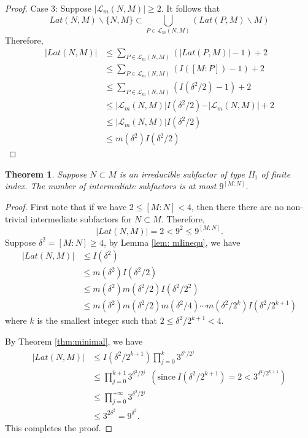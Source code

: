 \documentclass[11pt,letterpaper]{amsart}
\newtheorem{theorem}{Theorem}[section]
\theoremstyle{definition}
\theoremstyle{remark}
\begin{document}
\begin{proof}
    Case 3: Suppose $\vert \mathcal{L}_m(N,M)\vert\geq 2$. It follows that 
    \begin{equation*}
    Lat(N,M)\backslash \{N,M\}\subset \bigcup_{P\in \mathcal{L}_m(N,M)}( Lat(P,M)\backslash{M})
    \end{equation*}
    Therefore,
    \begin{align*}
    \vert Lat(N,M)\vert&\leq \sum_{P\in \mathcal{L}_m(N,M)}( \vert Lat(P,M)\vert-1)+2\\
    &\leq \sum_{P\in \mathcal{L}_m(N,M)}(I([M:P])-1)+2\\
    &\leq \sum_{P\in \mathcal{L}_m(N,M)}(I(\delta^2/2)-1)+2\\
    &\leq \vert \mathcal{L}_m(N,M)\vert I(\delta^2/2)-\vert \mathcal{L}_m(N,M)\vert+2\\
    &\leq \vert \mathcal{L}_m(N,M)\vert I(\delta^2/2)\\
    &\leq m(\delta^2)I(\delta^2/2)    
    \end{align*}
\end{proof}


\begin{theorem}\label{thm:whole}
	Suppose $N\subset M$ is an irreducible subfactor of type II$_1$ of finite index. The number of intermediate subfactors is at most $9^{[M:N]}$.
\end{theorem}
\begin{proof}
	First note that if we have $2\leq [M:N]<4$, then there there are no non-trivial intermediate subfactors for $N\subset M$. Therefore,
	\begin{equation*}
	\vert Lat(N,M) \vert=2<9^2\leq 9^{[M:N]}.
	\end{equation*}
	Suppose $\delta^2=[M:N]\geq 4$, by Lemma \ref{lem: mIinequ}, we have 
	\begin{align*}
	\vert Lat(N,M)\vert&\leq I(\delta^2)\\
	&\leq m(\delta^2)I(\delta^2/2)\\
	&\leq m(\delta^2)m(\delta^2/2)I(\delta^2/2^2)\\
	&\leq m(\delta^2)m(\delta^2/2)m(\delta^2/4)\cdots m(\delta^2/2^k)I(\delta^2/2^{k+1})
	\end{align*}
	where $k$ is the smallest integer such that $2\leq \delta^2/2^{k+1} < 4$.
	
	By Theorem \ref{thm:minimal}, we have
	\begin{align*}
	\vert Lat(N,M)\vert &\leq I(\delta^2/2^{k+1})\prod_{j=0}^{k} 3^{\delta^4/2^j}\\
	&\leq \prod_{j=0}^{k+1} 3^{\delta^2/2^j}~~ (\text{since}~I(\delta^2/2^{k+1})=2<3^{\delta^2/2^{k+1}})\\
	&\leq \prod_{j=0}^{+\infty} 3^{\delta^2/2^j}\\
	&\leq 3^{2\delta^2}=9^{\delta^2}.
	\end{align*}
	This completes the proof.
	
\end{proof}
\end{document}

